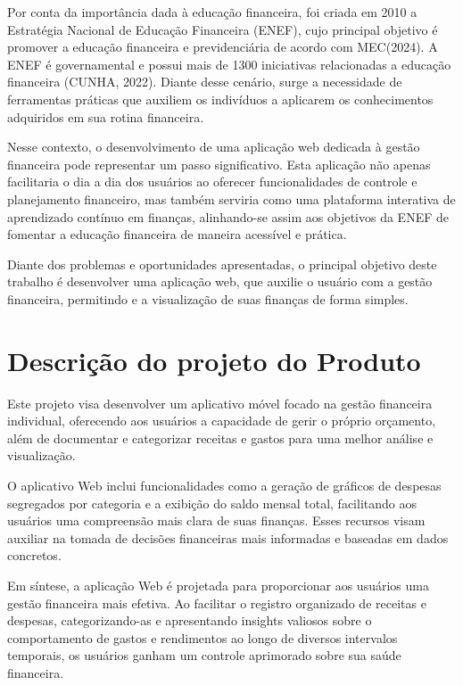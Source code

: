  Por conta da importância dada à educação financeira, foi criada em 2010 a Estratégia Nacional de Educação Financeira (ENEF), cujo principal objetivo é promover a educação financeira e previdenciária de acordo com MEC(2024). A ENEF é governamental e possui mais de 1300 iniciativas relacionadas a educação financeira (CUNHA, 2022). Diante desse cenário, surge a necessidade de ferramentas práticas que auxiliem os indivíduos a aplicarem os conhecimentos adquiridos em sua rotina financeira. 

Nesse contexto, o desenvolvimento de uma aplicação web dedicada à gestão financeira pode representar um passo significativo. Esta aplicação não apenas facilitaria o dia a dia dos usuários ao oferecer funcionalidades de controle e planejamento financeiro, mas também serviria como uma plataforma interativa de aprendizado contínuo em finanças, alinhando-se assim aos objetivos da ENEF de fomentar a educação financeira de maneira acessível e prática.

Diante dos problemas e oportunidades apresentadas, o principal objetivo deste trabalho é desenvolver uma aplicação web, que auxilie o usuário com a gestão financeira, permitindo e a visualização de suas finanças de forma simples.


\section{Descrição do projeto do Produto}


Este projeto visa desenvolver um aplicativo móvel focado na gestão financeira individual, oferecendo aos usuários a capacidade de gerir o próprio orçamento, além de documentar e categorizar receitas e gastos para uma melhor análise e visualização.

O aplicativo Web inclui funcionalidades como a geração de gráficos de despesas segregados por categoria e a exibição do saldo mensal total, facilitando aos usuários uma compreensão mais clara de suas finanças. Esses recursos visam auxiliar na tomada de decisões financeiras mais informadas e baseadas em dados concretos.

Em síntese, a aplicação Web é projetada para proporcionar aos usuários uma gestão financeira mais efetiva. Ao facilitar o registro organizado de receitas e despesas, categorizando-as e apresentando insights valiosos sobre o comportamento de gastos e rendimentos ao longo de diversos intervalos temporais, os usuários ganham um controle aprimorado sobre sua saúde financeira.

